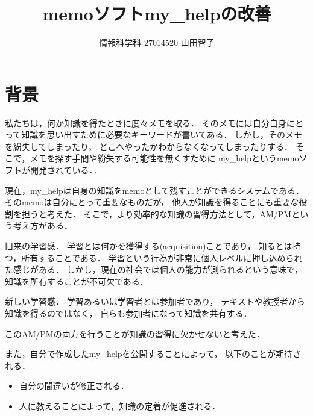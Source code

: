 \documentclass[a4j,twocolumn,uplatex]{jsarticle}
\begin{document}
\title{memoソフトmy\_helpの改善}
\author{情報科学科 \hspace{5mm} 27014520 \hspace{5mm}山田智子}
\date{}
\maketitle

\section{背景}
私たちは，何か知識を得たときに度々メモを取る．
そのメモには自分自身にとって知識を思い出すために必要なキーワードが書いてある． 
しかし，そのメモを紛失してしまったり，
どこへやったかわからなくなってしまったりする．
そこで，メモを探す手間や紛失する可能性を無くすために
my\_helpというmemoソフトが開発されている．\cite{my_help}．

現在，my\_helpは自身の知識をmemoとして残すことができるシステムである．
そのmemoは自分にとって重要なものだが，
他人が知識を得ることにも重要な役割を担うと考えた．
そこで，より効率的な知識の習得方法として，AM/PMという考え方がある．\cite{sfard}

\begin{description}
\vspace{-1mm}
\item[AM(acquisition metaphor)] 旧来の学習感．                                       
学習とは何かを獲得する(acquisition)ことであり，
知るとは持つ，所有することである．
学習という行為が非常に個人レベルに押し込められた感じがある．
しかし，現在の社会では個人の能力が測られるという意味で， 
知識を所有することが不可欠である．

\item[PM(participation metaphor)] 新しい学習感．
学習あるいは学習者とは参加者であり，
テキストや教授者から知識を得るのではなく，
自らも参加者になって知識を共有する．
 \end{description}
 
 このAM/PMの両方を行うことが知識の習得に欠かせないと考えた．

また，自分で作成したmy\_helpを公開することによって，
以下のことが期待される．
\begin{itemize}
\item 自分の間違いが修正される．
\vspace{-1mm}
\item 人に教えることによって，知識の定着が促進される．
\vspace{-1mm}
\end{itemize}
\end{document}
